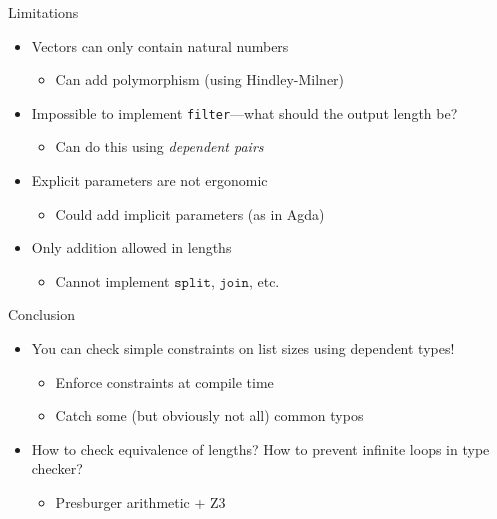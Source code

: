 \documentclass[fleqn]{beamer}
\begin{document}
\begin{frame}{Limitations}
\begin{itemize}
    \item Vectors can only contain natural numbers
    \begin{itemize}
        \item Can add polymorphism (using Hindley-Milner)
    \end{itemize}
    \item Impossible to implement \texttt{filter}---what should the output length be?
    \begin{itemize}
        \item Can do this using \emph{dependent pairs}
    \end{itemize}
    \item Explicit parameters are not ergonomic
    \begin{itemize}
        \item Could add implicit parameters (as in Agda)
    \end{itemize}
    \item Only addition allowed in lengths
    \begin{itemize}
        \item Cannot implement $\texttt{split}$, $\texttt{join}$, etc.
    \end{itemize}
\end{itemize}
\end{frame}

\begin{frame}{Conclusion}
\begin{itemize}
    \item You can check simple constraints on list sizes using dependent types!
    \begin{itemize}
        \item Enforce constraints at compile time
        \item Catch some (but obviously not all) common typos
    \end{itemize}
    \item How to check equivalence of lengths? How to prevent infinite loops in type checker?
    \begin{itemize}
        \item Presburger arithmetic + Z3
    \end{itemize}
\end{itemize}
\end{frame}
\end{document}
